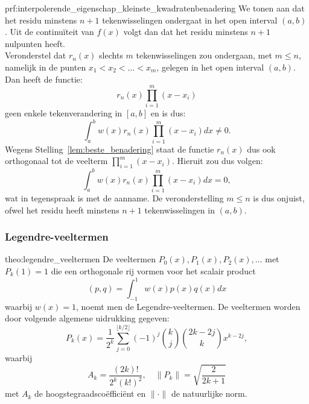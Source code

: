 \begin{prf}{prf:interpolerende_eigenschap_kleinste_kwadratenbenadering}
    We tonen aan dat het residu minstens $n+1$ tekenwisselingen ondergaat in het open interval $(a,b)$. Uit de continuïteit van $f(x)$ volgt dan dat het residu minstens $n+1$ nulpunten heeft. \\

    Veronderstel dat $r_n(x)$ slechts $m$ tekenwisselingen zou ondergaan, met $m\leq n$, namelijk in de punten $x_1 < x_2 < \ldots < x_m$, gelegen in het open interval $(a,b)$. Dan heeft de functie:
    \begin{equation*}
        r_n(x)\prod_{i=1}^{m}(x-x_i)
    \end{equation*}
    geen enkele tekenverandering in $[a,b]$ en is dus:
    \begin{equation*}
        \int_{a}^{b}w(x)r_n(x)\prod_{i=1}^{m}(x-x_i)dx \neq 0.
    \end{equation*}
    Wegens Stelling~\ref{lem:beste_benadering} staat de functie $r_n(x)$ dus ook orthogonaal tot de veelterm $\prod_{i=1}^{m}(x-x_i)$. Hieruit zou dus volgen:
    \begin{equation*}
        \int_{a}^{b}w(x)r_n(x)\prod_{i=1}^{m}(x-x_i)dx = 0,
    \end{equation*}
    wat in tegenspraak is met de aanname. De veronderstelling $m \leq n$ is dus onjuist, ofwel het residu heeft minstens $n+1$ tekenwisselingen in $(a,b)$.
\end{prf}

\newpage

\subsubsection{Legendre-veeltermen}

\vspace{0.5cm}

\begin{theo}{theo:legendre_veeltermen}
    De veeltermen $P_0(x),P_1(x),P_2(x),\ldots$ met $P_k(1) = 1$ die een orthogonale rij vormen voor het scalair product
    \begin{equation*}
        (p,q) = \int_{-1}^{1} w(x)p(x)q(x)dx
    \end{equation*}
    waarbij $w(x) = 1$, noemt men de Legendre-veeltermen. De veeltermen worden door volgende algemene uidrukking gegeven:
    \begin{equation*}
        P_k(x) = \frac{1}{2^k} \sum_{j=0}^{\lfloor k/2 \rfloor} (-1)^j \binom{k}{j} \binom{2k-2j}{k} x^{k-2j},
    \end{equation*}
    waarbij 
    \begin{equation*}
        A_k = \frac{(2k)!}{2^k(k!)^2}, \quad \|P_k\| = \sqrt{\frac{2}{2k+1}}
    \end{equation*}
    met $A_k$ de hoogstegraadscoëfficiënt en $\|\cdot\|$ de natuurlijke norm.
\end{theo}

